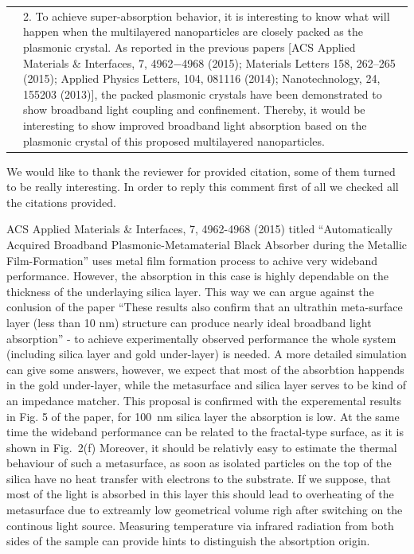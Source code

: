\documentclass[a4paper]{article}
\begin{document}




\begin{tabular}[!H]{l|p{}}
  \quad & 2. To achieve super-absorption behavior, it is interesting
  to know what will happen when the multilayered nanoparticles are
  closely packed as the plasmonic crystal. As reported in the previous
  papers [ACS Applied Materials \& Interfaces, 7, 4962−4968 (2015);
  Materials Letters 158, 262–265 (2015); Applied Physics Letters, 104,
  081116 (2014); Nanotechnology, 24, 155203 (2013)], the packed
  plasmonic crystals have been demonstrated to show broadband light
  coupling and confinement. Thereby, it would be interesting to show
  improved broadband light absorption based on the plasmonic crystal
  of this proposed multilayered nanoparticles. 
\end{tabular}

We would like to thank the reviewer for provided citation, some of
them turned to be really interesting. In order to reply this comment
first of all we checked all the citations provided.

ACS Applied Materials \& Interfaces, 7, 4962-4968 (2015) titled
``Automatically Acquired Broadband Plasmonic-Metamaterial Black
Absorber during the Metallic Film-Formation'' uses metal film
formation process to achive very wideband performance. However, the
absorption in this case is highly dependable on the thickness of the
underlaying silica layer.  This way we can argue against the conlusion
of the paper ``These results also confirm that an ultrathin
meta-surface layer (less than 10 nm) structure can produce nearly
ideal broadband light absorption'' - to achieve experimentally
observed performance the whole system (including silica layer and gold
under-layer) is needed. A more detailed simulation can give some
answers, however, we expect that most of the absorbtion happends in
the gold under-layer, while the metasurface and silica layer serves to
be kind of an impedance matcher.  This proposal is confirmed with the
experemental results in Fig. 5 of the paper, for 100~nm silica layer
the absorption is low.  At the same time the wideband performance can
be related to the fractal-type surface, as it is shown in Fig.~2(f)
Moreover, it should be relativly easy to estimate the thermal
behaviour of such a metasurface, as soon as isolated particles on the
top of the silica have no heat transfer with electrons to the
substrate.  If we suppose, that most of the light is absorbed in this
layer this should lead to overheating of the metasurface due to
extreamly low geometrical volume righ after switching on the continous
light source. Measuring temperature via infrared radiation from both
sides of the sample can provide hints to distinguish the absortption
origin.
\end{document}
